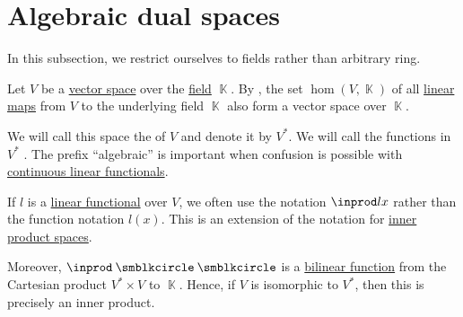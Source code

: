 \section{Algebraic dual spaces}\label{sec:algebraic_dual_spaces}

In this subsection, we restrict ourselves to fields rather than arbitrary ring.

\begin{definition}\label{def:dual_vector_space}
  Let \( V \) be a \hyperref[def:vector_space]{vector space} over the \hyperref[def:field]{field} \( \BbbK \). By , the set \( \hom(V, \BbbK) \) of all \hyperref[def:linear_function]{linear maps} from \( V \) to the underlying field \( \BbbK \) also form a vector space over \( \BbbK \).

  We will call this space the  of \( V \) and denote it by \( V^* \). We will call the functions in \( V^* \) . The prefix \enquote{algebraic} is important when confusion is possible with \hyperref[def:continuous_dual_space]{continuous linear functionals}.
\end{definition}

\begin{remark}\label{rem:dual_space_bilinear_form}
  If \( l \) is a \hyperref[def:dual_vector_space]{linear functional} over \( V \), we often use the notation \( \inprod l x \) rather than the function notation \( l(x) \). This is an extension of the notation for \hyperref[def:inner_product_space]{inner product spaces}.

  Moreover, \( \inprod \anon \anon \) is a \hyperref[def:multilinear_function]{bilinear function} from the Cartesian product \( V^* \times V \) to \( \BbbK \). Hence, if \( V \) is isomorphic to \( V^* \), then this is precisely an inner product.
\end{remark}

